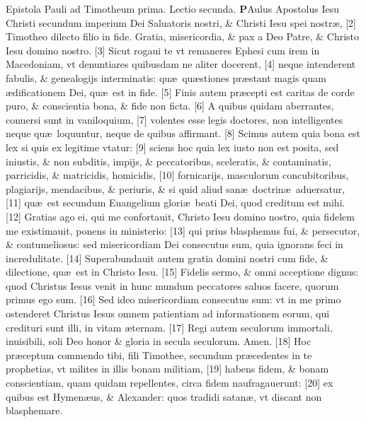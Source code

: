 \documentclass[a5paper,10pt]{book}
\def\leftmarginnote{%
	\lrmarginnote{\hskip -\marginparsep \hskip -6.5em}}
\def\ae{æ}
\begin{document}
\begin{multicols*}{2}
\newline {} \color{red} Epistola Pauli ad Timotheum prima. \quad Lectio secunda. \color{black}
\vspace{-1.25em}
\lettrine[lines=2]{\bfseries \color{red} P}{}Aulus\leftmarginnote{\begin{flushright}ca 1.\end{flushright}} Apostolus Iesu Christi secundum imperium Dei Saluatoris nostri, \& Christi Iesu spei nostr\ae , [2] Timotheo dilecto filio in fide. Gratia, misericordia, \& pax a Deo Patre, \& Christo Iesu domino nostro. [3] Sicut rogaui te vt remaneres Ephesi cum irem in Macedoniam, vt denuntiares quibusdam ne aliter docerent, [4] neque intenderent fabulis, \& genealogijs interminatis: qu\ae \ qu\ae stiones pr\ae stant magis quam \ae dificationem Dei, qu\ae \ est in fide. [5] Finis autem pr\ae cepti est caritas de corde puro, \& conscientia bona, \& fide non ficta.
[6] A quibus quidam aberrantes, conuersi sunt in vaniloquium, [7] volentes esse legis doctores, non intelligentes neque qu\ae \ loquuntur, neque de quibus affirmant. [8] Scimus autem quia bona est lex si quis ex legitime vtatur: [9] sciens hoc quia lex iusto non est posita, sed iniustis, \& non subditis, impijs, \& peccatoribus, sceleratis, \& contaminatis, parricidis, \& matricidis, homicidis, [10] fornicarijs, masculorum concubitoribus, plagiarijs, mendacibus, \& periuris, \& si quid aliud san\ae \ doctrin\ae \ aduersatur,
[11] qu\ae \ est secundum Euangelium glori\ae \ beati Dei, quod creditum est mihi. [12] Gratias ago ei, qui me confortauit, Christo Iesu domino nostro, quia fidelem me existimauit, ponens in ministerio: [13] qui prius blasphemus fui, \& persecutor, \& contumeliosus: sed misericordiam Dei consecutus sum, quia ignorans feci in incredulitate. [14] Superabundauit autem gratia domini nostri cum fide, \& dilectione, qu\ae \ est in Christo Iesu. [15] Fidelis sermo, \& omni acceptione dignus: quod Christus Iesus venit in hunc mundum peccatores saluos facere, quorum primus ego sum.
[16] Sed ideo misericordiam consecutus sum: vt in me primo ostenderet Christus Iesus omnem patientiam ad informationem eorum, qui credituri sunt illi, in vitam \ae ternam. [17] Regi autem seculorum immortali, inuisibili, soli Deo honor \& gloria in secula seculorum. Amen. [18] Hoc pr\ae ceptum commendo tibi, fili Timothee, secundum pr\ae cedentes in te prophetias, vt milites in illis bonam militiam, [19] habens fidem, \& bonam conscientiam, quam quidam repellentes, circa fidem naufragauerunt: [20] ex quibus est Hymen\ae us, \& Alexander: quos tradidi satan\ae , vt discant non blasphemare.

\end{multicols*}
\end{document}
